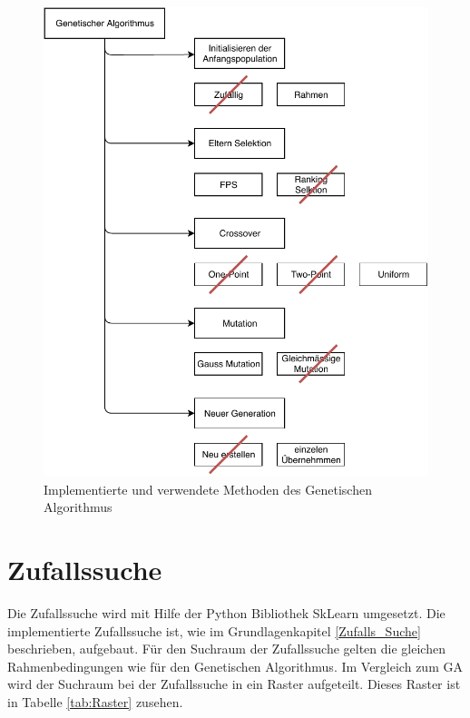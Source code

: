 \noindent%
\begin{figure}[H]
  \centering  
  \includegraphics[scale=0.9]{img/Ga_Methoden.pdf}
  \caption{Implementierte und verwendete Methoden des Genetischen Algorithmus}
  \label{fig:Ga_Methoden}
\end{figure}

\section{Zufallssuche}
Die Zufallssuche wird mit Hilfe der Python Bibliothek SkLearn umgesetzt. Die implementierte Zufallssuche ist, wie im Grundlagenkapitel \ref{Zufalls_Suche} beschrieben, aufgebaut. Für den Suchraum der Zufallssuche gelten die gleichen Rahmenbedingungen wie für den Genetischen Algorithmus. Im Vergleich zum GA wird der Suchraum bei der Zufallssuche in ein Raster aufgeteilt. Dieses Raster ist in Tabelle \ref{tab:Raster} zusehen.


